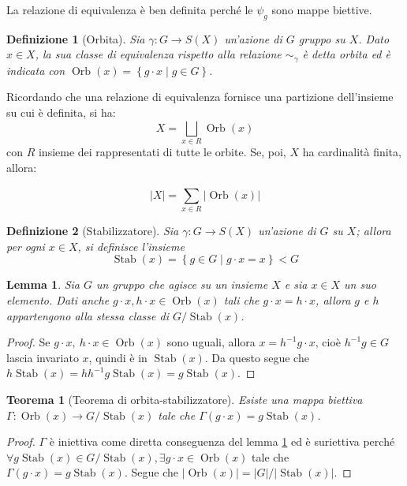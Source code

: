 \documentclass[12pt]{scrartcl}
\theoremstyle{style}
\newtheorem{definizione}{Definizione}[section]
\newtheorem{teorema}{Teorema}[section]
\newtheorem{lemma}{Lemma}[teorema]
\newenvironment{boxenv}[1][]{
    \begin{eqbox}[#1]
    }{
   \end{eqbox}
}
\numberwithin{equation}{subsection}
\begin{document}
La relazione di equivalenza \`e ben definita perch\'e le $\psi _g$ sono mappe biettive.
\begin{definizione}
	[Orbita]
	Sia $\gamma :G \to S(X)$ un'azione di $G$ gruppo su $X$. Dato $x \in X$, la sua classe di equivalenza rispetto alla relazione $\sim _\gamma$ \`e detta \textit{orbita} ed \`e indicata con $\operatorname{Orb} (x) = \left\{ g \cdot  x  \mid g \in G\right\} $.
\end{definizione}
\noindent Ricordando che una relazione di equivalenza fornisce una partizione dell'insieme su cui \`e definita, si ha:
\begin{equation}
	X = \bigsqcup_{x \in R} \operatorname{Orb} (x)
\end{equation}
con $R$ insieme dei rappresentati di tutte le orbite.
Se, poi, $X$ ha cardinalit\`a finita, allora:
\begin{boxenv}[]
\begin{equation}
	\lvert X \rvert  = \sum_{x \in R}^{} \lvert \operatorname{Orb} (x) \rvert 
\end{equation}
\end{boxenv}
\begin{definizione}
	[Stabilizzatore]
	Sia $\gamma: G \to S(X)$ un'azione di $G$ su $X$; allora per ogni $x \in X$, si definisce l'insieme 
	\[
	\operatorname{Stab} (x) = \left\{ g \in G  \mid g \cdot  x = x \right\} < G 
	\] 	
\end{definizione}
\begin{lemma}\label{l111}
	Sia $G$ un gruppo che agisce su un insieme $X$ e sia $x \in X$ un suo elemento. Dati anche $g\cdot x , h \cdot x \in \operatorname{Orb} (x)$ tali che $g \cdot x = h\cdot x$, allora $g$ e $h$ appartengono alla stessa classe di $G / \operatorname{Stab} (x)$.
\end{lemma}
\begin{proof}
	Se $g \cdot x, \ h\cdot x \in \operatorname{Orb} (x)$ sono uguali, allora $x =h^{-1} g \cdot x $, cio\`e $h^{-1} g \in G$ lascia invariato $x$, quindi \`e in $\operatorname{Stab} (x)$.
	Da questo segue che $h \operatorname{Stab} (x) = h h^{-1} g \operatorname{Stab} (x) = g \operatorname{Stab} (x)$.
\end{proof}
\begin{teorema}[Teorema di orbita-stabilizzatore]\label{osth}
	Esiste una mappa biettiva $\Gamma : \operatorname{Orb} (x) \to G / \operatorname{Stab} (x)$ tale che $\Gamma(g \cdot x) = g \operatorname{Stab} (x)$.
\end{teorema}
	\begin{proof}
		$\Gamma$ \`e iniettiva come diretta conseguenza del lemma \ref{l111} ed \`e suriettiva perch\'e $\forall g \operatorname{Stab} (x) \in G / \operatorname{Stab} (x), \exists g\cdot x \in \operatorname{Orb} (x)$ tale che $\Gamma(g\cdot x) = g \operatorname{Stab} (x)$.
		Segue che $\lvert \operatorname{Orb} (x)  \rvert = \lvert G \rvert / \lvert \operatorname{Stab} (x) \rvert $.
	\end{proof}
\end{document}

